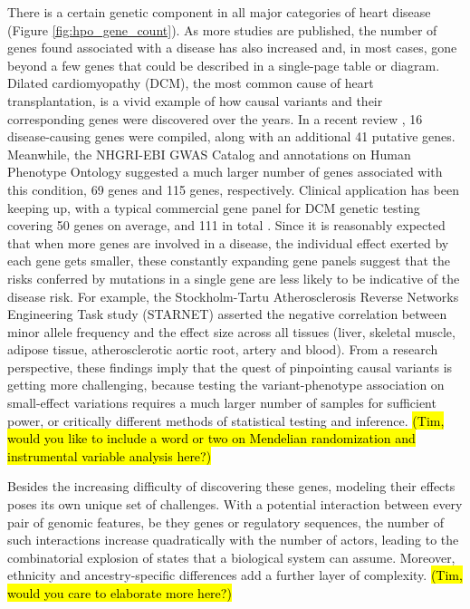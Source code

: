 \documentclass[letter]{bioinfo}
\begin{document}
There is a certain genetic component in all major categories of heart disease (Figure \ref{fig:hpo_gene_count}).  As more studies are published, the number of genes found associated with a disease has also increased and, in most cases, gone beyond a few genes that could be described in a single-page table or diagram.  Dilated cardiomyopathy (DCM), the most common cause of heart transplantation, is a vivid example of how causal variants and their corresponding genes were discovered over the years.  In a recent review \citep{Burke:2016:Clinical}, 16 disease-causing genes were compiled, along with an additional 41 putative genes.  Meanwhile, the NHGRI-EBI GWAS Catalog \citep{MacArthur:2017:new} and annotations on Human Phenotype Ontology \citep{Kohler:2017:Human} suggested a much larger number of genes associated with this condition, 69 genes and 115 genes, respectively.  Clinical application has been keeping up, with a typical commercial gene panel for DCM genetic testing covering 50 genes on average, and 111 in total \citep{McNally:2017:Dilated}.  Since it is reasonably expected that when more genes are involved in a disease, the individual effect exerted by each gene gets smaller, these constantly expanding gene panels suggest that the risks conferred by mutations in a single gene are less likely to be indicative of the disease risk.  For example, the Stockholm-Tartu Atherosclerosis Reverse Networks Engineering Task study (STARNET) \citep{Franzen:2016:Cardiometabolic} asserted the negative correlation between minor allele frequency and the effect size across all tissues (liver, skeletal muscle, adipose tissue, atherosclerotic aortic root, artery and blood).  From a research perspective, these findings imply that the quest of pinpointing causal variants is getting more challenging, because testing the variant-phenotype association on small-effect variations requires a much larger number of samples for sufficient power, or critically different methods of statistical testing and inference. \hl{(Tim, would you like to include a word or two on Mendelian randomization and instrumental variable analysis here?)}
	
	
Besides the increasing difficulty of discovering these genes, modeling their effects poses its own unique set of challenges. With a potential interaction between every pair of genomic features, be they genes or regulatory sequences, the number of such interactions increase quadratically with the number of actors, leading to the combinatorial explosion of states that a biological system can assume.  Moreover, ethnicity and ancestry-specific differences add a further layer of complexity. \hl{(Tim, would you care to elaborate more here?)}
	
\end{document}
